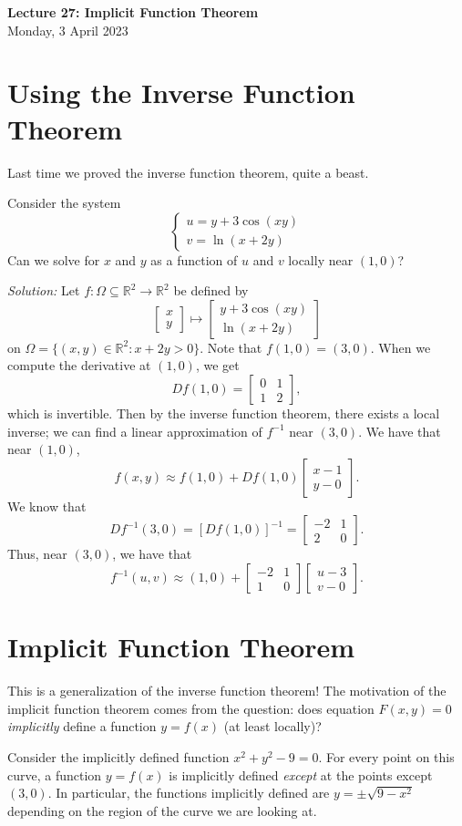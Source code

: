 \documentclass[11pt]{article}
\theoremstyle{definition}
\newcommand{\R}{\mathbb{R}}                      %
\newcommand{\mat}{\begin{bmatrix}}
\newcommand{\trix}{\end{bmatrix}}
\begin{document}
\thispagestyle{empty}

\begin{center}
{\LARGE \bf Lecture 27: Implicit Function Theorem}\\
{\large Monday, 3 April 2023}\\
\end{center}
\section{Using the Inverse Function Theorem}

Last time we proved the inverse function theorem, quite a beast. 

\ex Consider the system
$$
\begin{cases}
u=y+3\cos(xy)\\
v=\ln(x+2y)
\end{cases}
$$
Can we solve for $x$ and $y$ as a function of $u$ and $v$ locally near $(1,0)$?

\textit{Solution:} Let $f:\Omega \subseteq \R^2\to \R^2$ be defined by
$$
\mat x\\y\trix \mapsto \mat y+3\cos (xy)\\ \ln(x+2y) \trix
$$
on $\Omega=\{(x,y)\in\R^2:x+2y>0\}$. Note that $f(1,0)=(3,0)$. When we compute the derivative at $(1,0)$, we get
$$
Df(1,0)=\mat 0 & 1 \\ 1 & 2 \trix,
$$
which is invertible. Then by the inverse function theorem, there exists a local inverse; we can find a linear approximation of $f^{-1}$ near $(3,0)$. We have that near $(1,0)$,
$$
f(x,y)\approx f(1,0)+Df(1,0)\mat x-1 \\ y-0 \trix.
$$
We know that 
$$
Df^{-1}(3,0)=[Df(1,0)]^{-1}=\mat -2 & 1 \\ 2 & 0 \trix.
$$
Thus, near $(3,0)$, we have that
$$
f^{-1}(u,v)\approx (1,0)+\mat -2 & 1 \\ 1& 0\trix \mat u-3 \\ v-0 \trix .
$$
\section{Implicit Function Theorem}

This is a generalization of the inverse function theorem! The motivation of the implicit function theorem comes from the question: does equation $F(x,y)=0$ \textit{implicitly} define a function $y=f(x)$ (at least locally)?

\ex Consider the implicitly defined function $x^2+y^2-9=0$. For every point on this curve, a function $y=f(x)$ is implicitly defined \textit{except} at the points except $(3,0)$. In particular, the functions implicitly defined are $y=\pm\sqrt{9-x^2}$ depending on the region of the curve we are looking at.
\end{document}
